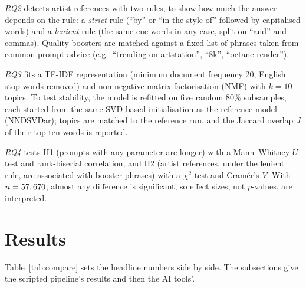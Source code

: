 \documentclass[conference]{IEEEtran}
\begin{document}
\textit{RQ2} detects artist references with two rules, to show how much the
answer depends on the rule: a \textit{strict} rule (``by'' or ``in the
style of'' followed by capitalised words) and a \textit{lenient} rule (the
same cue words in any case, split on ``and'' and commas). Quality boosters
are matched against a fixed list of \NBoosters{} phrases taken from common prompt
advice (e.g.\ ``trending on artstation'', ``8k'', ``octane render'').

\textit{RQ3} fits a TF-IDF representation (minimum document frequency 20,
English stop words removed) and non-negative matrix factorisation (NMF)
\cite{leeSeungNMF1999} with $k=10$ topics. To test stability, the model is refitted on five random 80\% subsamples,
each started from the same SVD-based initialisation as the reference model
(NNDSVDar); topics are matched to the reference run, and the Jaccard
overlap $J$ of their top ten words is reported.

\textit{RQ4} tests H1 (prompts with any parameter are longer) with a
Mann--Whitney $U$ test and rank-biserial correlation, and H2 (artist
references, under the lenient rule, are associated with booster phrases)
with a $\chi^2$ test and Cram\'er's $V$. With $n=57,670$, almost any difference is
significant, so effect sizes, not $p$-values, are interpreted.

\section{Results}

Table~\ref{tab:compare} sets the headline numbers side by side. The subsections give the scripted pipeline's results and then the AI
tools'.
\end{document}
